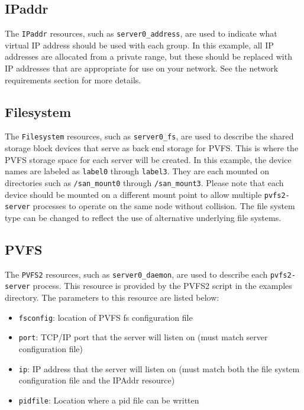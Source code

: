 \documentclass[11pt]{article}
\begin{document}
\subsection{IPaddr}

The \texttt{IPaddr} resources, such as \texttt{server0\_address}, are
used to indicate what virtual IP address should be used with each group.
In this example, all IP addresses are allocated from a private range, but
these should be replaced with IP addresses that are appropriate for use
on your network.  See the network requirements section for more details.

\subsection{Filesystem}

The \texttt{Filesystem} resources, such as \texttt{server0\_fs}, are used to
describe the shared storage block devices that serve as back end storage
for PVFS.  This is where the PVFS storage space for each server will
be created.  In this example, the device names are labeled as
\texttt{label0}
through \texttt{label3}.  They are each mounted on directories such
as \texttt{/san\_mount0} through \texttt{/san\_mount3}.  Please note
that each device should be mounted on a different mount point to allow
multiple \texttt{pvfs2-server} processes to operate on the same node without
collision.  The file system type can be changed to reflect the use of
alternative underlying file systems.

\subsection{PVFS}

The \texttt{PVFS2} resources, such as \texttt{server0\_daemon}, are used
to describe each \texttt{pvfs2-server} process.  This resource is provided by the
PVFS2 script in the examples directory.  The parameters to this resource
are listed below:
\begin{itemize}
\item \texttt{fsconfig}: location of PVFS fs configuration file
\item \texttt{port}: TCP/IP port that the server will listen on (must match server
configuration file)
\item \texttt{ip}: IP address that the server will listen on (must match both the file
system configuration file and the IPAddr resource)
\item \texttt{pidfile}: Location where a pid file can be written
\end{itemize}
\end{document}
